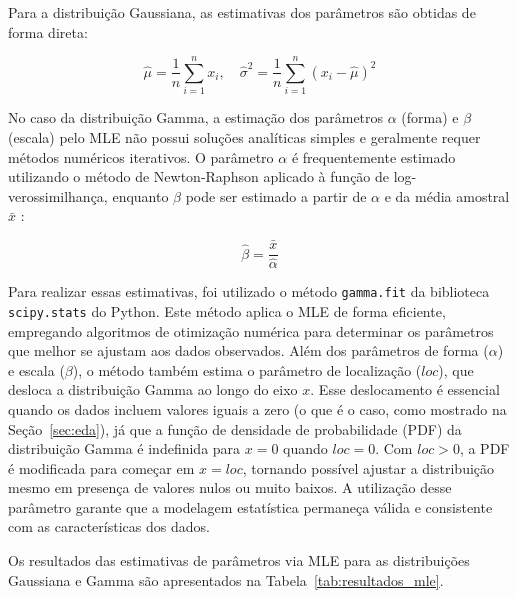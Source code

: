 Para a distribuição Gaussiana, as estimativas dos parâmetros são obtidas de forma direta:

\begin{equation}
    \hat{\mu} = \frac{1}{n} \sum_{i=1}^{n} x_i, \quad \hat{\sigma}^2 = \frac{1}{n} \sum_{i=1}^{n} (x_i - \hat{\mu})^2
\end{equation}

No caso da distribuição Gamma, a estimação dos parâmetros \(\alpha\) (forma) e \(\beta\) (escala) pelo MLE não possui soluções analíticas simples e geralmente requer métodos numéricos iterativos. O parâmetro \(\alpha\) é frequentemente estimado utilizando o método de Newton-Raphson aplicado à função de log-verossimilhança, enquanto \(\beta\) pode ser estimado a partir de \(\alpha\) e da média amostral \(\bar{x}\) \cite{minka2002estimating}:

\begin{equation}
    \hat{\beta} = \frac{\bar{x}}{\hat{\alpha}}
\end{equation}

Para realizar essas estimativas, foi utilizado o método \texttt{gamma.fit} da biblioteca \texttt{scipy.stats} do Python. Este método aplica o MLE de forma eficiente, empregando algoritmos de otimização numérica para determinar os parâmetros que melhor se ajustam aos dados observados. Além dos parâmetros de forma (\(\alpha\)) e escala (\(\beta\)), o método também estima o parâmetro de localização (\(loc\)), que desloca a distribuição Gamma ao longo do eixo \(x\). Esse deslocamento é essencial quando os dados incluem valores iguais a zero (o que é o caso, como mostrado na Seção~\ref{sec:eda}), já que a função de densidade de probabilidade (PDF) da distribuição Gamma é indefinida para \(x = 0\) quando \(loc = 0\). Com \(loc > 0\), a PDF é modificada para começar em \(x = loc\), tornando possível ajustar a distribuição mesmo em presença de valores nulos ou muito baixos. A utilização desse parâmetro garante que a modelagem estatística permaneça válida e consistente com as características dos dados.


Os resultados das estimativas de parâmetros via MLE para as distribuições Gaussiana e Gamma são apresentados na Tabela~\ref{tab:resultados_mle}.

